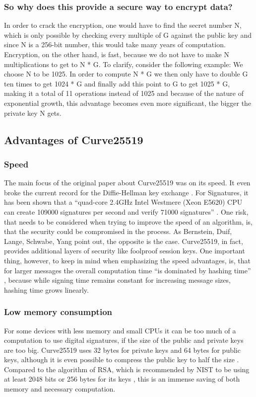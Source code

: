 \subsubsection{So why does this provide a secure way to encrypt data?}
In order to crack the encryption, one would have to find the secret number N, which is only possible by checking every multiple of G against the public key and since N is a 256-bit number, this would take many years of computation.
Encryption, on the other hand, is fast, because we do not have to make N multiplications to get to N * G. To clarify, consider the following example:
We choose N to be 1025. In order to compute N * G we then only have to double G ten times to get 1024 * G and finally add this point to G to get 1025 * G, making it a total of 11 operations instead of 1025 and because of the nature of exponential growth, this advantage becomes even more significant, the bigger the private key N gets.

\subsection{Advantages of Curve25519}
\subsubsection{Speed}
The main focus of the original paper about Curve25519 was on its speed. It even broke the current record for the Diffie-Hellman key exchange \cite{ECDH}. For Signatures, it has been shown that a ``quad-core 2.4GHz Intel Westmere (Xeon E5620) CPU can create 109000 signatures per second and verify 71000 signatures'' \cite{Curve25519}. One risk, that needs to be considered when trying to improve the speed of an algorithm, is, that the security could be compromised in the process. As Bernstein, Duif, Lange, Schwabe, Yang \cite{Curve25519} point out, the opposite is the case. Curve25519, in fact, provides additional layers of security like foolproof session keys. One important thing, however, to keep in mind when emphasizing the speed advantages, is, that for larger messages the overall computation time “is dominated by hashing time” \cite{Curve25519}, because while signing time remains constant for increasing message sizes, hashing time grows linearly. 

\subsubsection{Low memory consumption}
For some devices with less memory and small CPUs it can be too much of a computation to use digital signatures, if the size of the public and private keys are too big. Curve25519 uses 32 bytes for private keys and 64 bytes for public keys, although it is even possible to compress the public key to half the size \cite{ECDH}. Compared to the algorithm of RSA, which is recommended by NIST to be using at least 2048 bits or 256 bytes for its keys \cite{NistKeyMan}, this is an immense saving of both memory and necessary computation.

